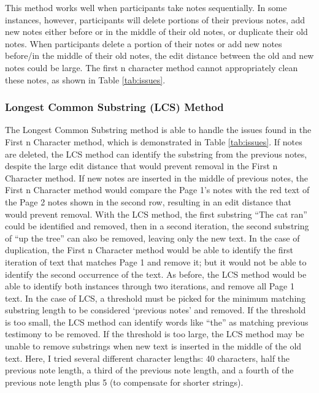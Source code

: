 \documentclass[print]{nuthesis}
\begin{document}
This method works well when participants take notes sequentially.
In some instances, however, participants will delete portions of their previous notes, add new notes either before or in the middle of their old notes, or duplicate their old notes.
When participants delete a portion of their notes or add new notes before/in the middle of their old notes, the edit distance between the old and new notes could be large.
The first n character method cannot appropriately clean these notes, as shown in Table \ref{tab:issues}.

\hypertarget{longest-common-substring-lcs-method}{%
\subsubsection{Longest Common Substring (LCS) Method}\label{longest-common-substring-lcs-method}}

The Longest Common Substring method is able to handle the issues found in the First n Character method, which is demonstrated in Table \ref{tab:issues}.
If notes are deleted, the LCS method can identify the substring from the previous notes, despite the large edit distance that would prevent removal in the First n Character method.
If new notes are inserted in the middle of previous notes, the First n Character method would compare the Page 1's notes with the red text of the Page 2 notes shown in the second row, resulting in an edit distance that would prevent removal.
With the LCS method, the first substring ``The cat ran'' could be identified and removed, then in a second iteration, the second substring of ``up the tree'' can also be removed, leaving only the new text.
In the case of duplication, the First n Character method would be able to identify the first iteration of text that matches Page 1 and remove it; but it would not be able to identify the second occurrence of the text.
As before, the LCS method would be able to identify both instances through two iterations, and remove all Page 1 text.
In the case of LCS, a threshold must be picked for the minimum matching substring length to be considered `previous notes' and removed.
If the threshold is too small, the LCS method can identify words like ``the'' as matching previous testimony to be removed.
If the threshold is too large, the LCS method may be unable to remove substrings when new text is inserted in the middle of the old text.
Here, I tried several different character lengths: 40 characters, half the previous note length, a third of the previous note length, and a fourth of the previous note length plus 5 (to compensate for shorter strings).
\end{document}
